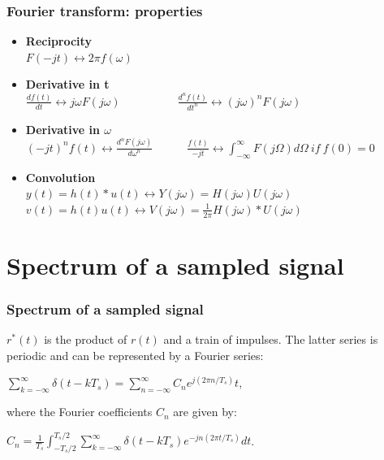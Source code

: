 \begin{frame}
	\frametitle{Fourier transform: properties}
	\begin{itemize}
		\item \textbf{Reciprocity} \\
		\medskip
		$F(-jt) \leftrightarrow  2 \pi f(\omega)$
		\medskip
		\item \textbf{Derivative in t} \\
		\medskip
		$\frac{df(t)}{dt} \leftrightarrow j\omega F(j\omega) \qquad \qquad \quad \frac{d^nf(t)}{dt^n} \leftrightarrow (j\omega)^n F(j\omega)$
		\medskip
		\item \textbf{Derivative in $\omega$} \\
		\medskip
		$(-jt)^n f(t) \leftrightarrow \frac{d^n F(j\omega)}{d\omega^n} \qquad \quad \frac{f(t)}{-jt} \leftrightarrow \int_{-\infty}^\infty F(j\Omega) d\Omega \> if \> f(0) = 0$
		\medskip
		\item \textbf{Convolution} \\
		\medskip
		$y(t) = h(t) * u(t) \leftrightarrow Y(j\omega) = H(j\omega) U(j\omega)$\\
		$v(t) = h(t)u(t) \leftrightarrow V(j\omega) = \frac{1}{2\pi} H(j\omega)*U(j\omega)$
	\end{itemize}
\end{frame}

\section{Spectrum of a sampled signal}

\begin{frame}
	\frametitle{Spectrum of a sampled signal}
	$r^*(t)$ is the product of $r(t)$ and a train of impulses. The latter series is periodic and can be represented by a Fourier series:\\
	\begin{center}
		$\sum_{k=-\infty}^{\infty} \delta(t-kT_s) = \sum_{n=-\infty}^{\infty} C_ne^{j(2\pi n/T_s)}t$,
	\end{center}
	where the Fourier coefficients $C_n$ are given by:\\
	\begin{center}
		$C_n=\frac{1}{T_s}\int_{-T_s/2}^{T_s/2} \sum_{k=-\infty}^{\infty} \delta(t-kT_s)e^{-jn(2\pi t/T_s)}dt$.
	\end{center}
	
\end{frame}

